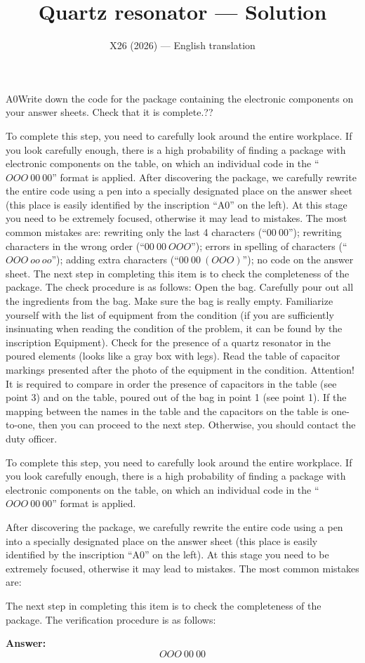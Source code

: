 \documentclass[11pt,a4paper]{article}
\title{\textbf{Quartz resonator --- Solution}}
\author{\normalsize X26 (2026) — English translation}
\date{}
\begin{document}
\maketitle\vspace{-0.5em}
\begin{solcard}{A0}{Write down the code for the package containing the electronic components on your answer sheets. Check that it is complete.}{??}

To complete this step, you need to carefully look around the entire workplace. If you look carefully enough, there is a high probability of finding a package with electronic components on the table, on which an individual code in the “$OOO~00~00$” format is applied. After discovering the package, we carefully rewrite the entire code using a pen into a specially designated place on the answer sheet (this place is easily identified by the inscription “A0” on the left). At this stage you need to be extremely focused, otherwise it may lead to mistakes. The most common mistakes are: rewriting only the last 4 characters (“$00~00$”); rewriting characters in the wrong order (“$00~00~OOO$”); errors in spelling of characters (“$OOO~oo~oo$”); adding extra characters (“$00~00~(OOO)$”); no code on the answer sheet. The next step in completing this item is to check the completeness of the package. The check procedure is as follows: Open the bag. Carefully pour out all the ingredients from the bag. Make sure the bag is really empty. Familiarize yourself with the list of equipment from the condition (if you are sufficiently insinuating when reading the condition of the problem, it can be found by the inscription Equipment). Check for the presence of a quartz resonator in the poured elements (looks like a gray box with legs). Read the table of capacitor markings presented after the photo of the equipment in the condition. Attention! It is required to compare in order the presence of capacitors in the table (see point 3) and on the table, poured out of the bag in point 1 (see point 1). If the mapping between the names in the table and the capacitors on the table is one-to-one, then you can proceed to the next step. Otherwise, you should contact the duty officer.


To complete this step, you need to carefully look around the entire workplace. If you look carefully enough, there is a high probability of finding a package with electronic components on the table, on which an individual code in the “$OOO~00~00$” format is applied.


After discovering the package, we carefully rewrite the entire code using a pen into a specially designated place on the answer sheet (this place is easily identified by the inscription “A0” on the left). At this stage you need to be extremely focused, otherwise it may lead to mistakes. The most common mistakes are:


The next step in completing this item is to check the completeness of the package. The verification procedure is as follows:

\par\smallskip\noindent\textbf{Answer:} \[OOO~00~00\]
\end{solcard}
\end{document}
